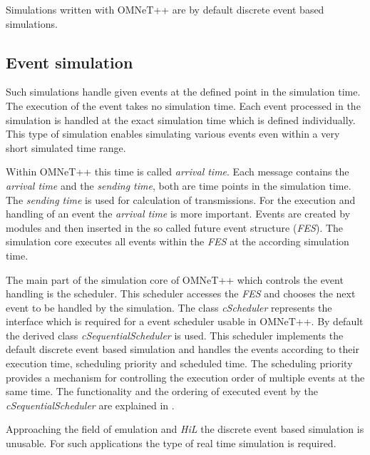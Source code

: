 \documentclass[journal]{IEEEtran}
\begin{document}
Simulations written with OMNeT++ are by default discrete event based simulations.

\subsection{Event simulation}
\label{sec:EventSimulation}
Such simulations handle given events at the defined point in the simulation time.
The execution of the event takes no simulation time.
Each event processed in the simulation is handled at the exact simulation time which is defined individually.
This type of simulation enables simulating various events even within a very short simulated time range.

Within OMNeT++ this time is called \emph{arrival time}.
Each message contains the \emph{arrival time} and the \emph{sending time}, both are time points in the simulation time.
The \emph{sending time} is used for calculation of transmissions.
For the execution and handling of an event the \emph{arrival time} is more important.
Events are created by modules and then inserted in the so called future event structure (\emph{FES}).
The simulation core executes all events within the \emph{FES} at the according simulation time.

The main part of the simulation core of OMNeT++ which controls the event handling is the scheduler.
This scheduler accesses the \emph{FES} and chooses the next event to be handled by the simulation.
The class \emph{cScheduler} represents the interface which is required for a event scheduler usable in OMNeT++.
By default the derived class \emph{cSequentialScheduler} is used.
This scheduler implements the default discrete event based simulation and handles the events according to their execution time, scheduling priority and scheduled time.
The scheduling priority provides a mechanism for controlling the execution order of multiple events at the same time.
The functionality and the ordering of executed event by the \emph{cSequentialScheduler} are explained in \cite[section 4.1]{OMNETMANUAL}.

Approaching the field of emulation and \emph{HiL} the discrete event based simulation is unusable.
For such applications the type of real time simulation is required.
\end{document}
